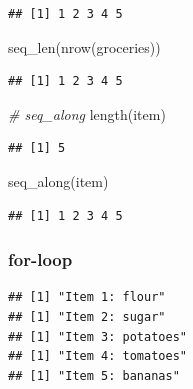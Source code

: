 \documentclass[
  11pt,
]{article}
\newenvironment{Shaded}{\begin{snugshade}}{\end{snugshade}}
\newcommand{\CommentTok}[1]{\textcolor[rgb]{0.56,0.35,0.01}{\textit{#1}}}
\newcommand{\ControlFlowTok}[1]{\textcolor[rgb]{0.13,0.29,0.53}{\textbf{#1}}}
\newcommand{\FunctionTok}[1]{\textcolor[rgb]{0.00,0.00,0.00}{#1}}
\newcommand{\NormalTok}[1]{#1}
\newcommand{\SpecialCharTok}[1]{\textcolor[rgb]{0.00,0.00,0.00}{#1}}
\newcommand{\StringTok}[1]{\textcolor[rgb]{0.31,0.60,0.02}{#1}}
\begin{document}
\begin{verbatim}
## [1] 1 2 3 4 5
\end{verbatim}

\begin{Shaded}
\begin{Highlighting}[]
\FunctionTok{seq\_len}\NormalTok{(}\FunctionTok{nrow}\NormalTok{(groceries))}
\end{Highlighting}
\end{Shaded}

\begin{verbatim}
## [1] 1 2 3 4 5
\end{verbatim}

\begin{Shaded}
\begin{Highlighting}[]
\CommentTok{\# seq\_along}
\FunctionTok{length}\NormalTok{(item)}
\end{Highlighting}
\end{Shaded}

\begin{verbatim}
## [1] 5
\end{verbatim}

\begin{Shaded}
\begin{Highlighting}[]
\FunctionTok{seq\_along}\NormalTok{(item)}
\end{Highlighting}
\end{Shaded}

\begin{verbatim}
## [1] 1 2 3 4 5
\end{verbatim}

\hypertarget{for-loop}{%
\subsubsection{for-loop}\label{for-loop}}

\begin{Shaded}
\end{Shaded}

\begin{verbatim}
## [1] "Item 1: flour"
## [1] "Item 2: sugar"
## [1] "Item 3: potatoes"
## [1] "Item 4: tomatoes"
## [1] "Item 5: bananas"
\end{verbatim}
\end{document}
